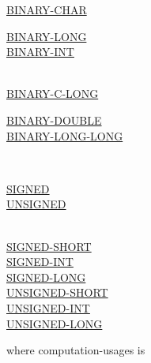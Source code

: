 \documentclass[a4paper,oneside,svgnames]{scrbook}
\makeatletter
\newcommand{\key}[1]{\underline{#1}}
\newcommand{\gnucobol}[1]{%
  \colorbox{orange!75}{#1}}
\newcommand{\miscext}[1]{%
  \colorbox{blue!50}{#1}}
\newenvironment{0-1}{$\left[ \begin{tabular}{@{}l@{}}}{\end{tabular} \right]$}
\newenvironment{1=}{$\left\{ \begin{tabular}{@{}l@{}}}{\end{tabular} \right\}$}
\makeatother
\begin{document}
\begin{1=}
  \begin{1=}
    \key{BINARY-CHAR} \\

    \begin{1=}
      \key{BINARY-LONG} \\
      \gnucobol{\key{BINARY-INT}}
    \end{1=} \\

    \gnucobol{\key{BINARY-C-LONG}} \\
    
    \begin{1=}
      \key{BINARY-DOUBLE} \\
      \gnucobol{\key{BINARY-LONG-LONG}} \\
    \end{1=} \\
  \end{1=}
  \begin{0-1}
    \key{SIGNED} \\
    \key{UNSIGNED}
  \end{0-1} \\

  \miscext{\key{SIGNED-SHORT}} \\
  \miscext{\key{SIGNED-INT}} \\
  \miscext{\key{SIGNED-LONG}} \\

  \miscext{\key{UNSIGNED-SHORT}} \\
  \miscext{\key{UNSIGNED-INT}} \\
  \miscext{\key{UNSIGNED-LONG}}
\end{1=}

where computation-usages is
\end{document}
